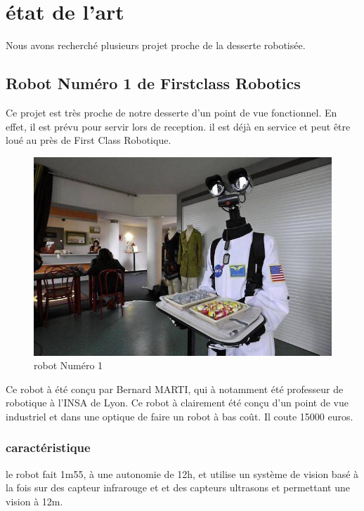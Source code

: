 \chapter{état de l'art}
Nous avons recherché plusieurs projet proche de la desserte robotisée.

\section{Robot Numéro 1 de Firstclass Robotics}
Ce projet est très proche de notre desserte d'un point de vue fonctionnel. En effet, il est prévu pour servir lors de reception. il est déjà en service et peut être loué au près de First Class Robotique. 

\begin{figure}[h]
\begin{center}
\includegraphics[scale=0.55]{Images/robot_n1.jpg}
\caption{robot Numéro 1}
\label{robot Numéro 1}
\end{center}
\end{figure} 

Ce robot à été conçu par Bernard MARTI, qui à notamment été professeur
de robotique à l'INSA de Lyon. Ce robot à clairement été conçu d'un
point de vue industriel et dans une optique de faire un robot à bas
coût. Il coute 15000 euros.

\subsection{caractéristique}
le robot fait 1m55, à une autonomie de 12h, et utilise un système de
vision basé à la fois sur des capteur infrarouge et et des capteurs
ultrasons et permettant une vision à 12m.


